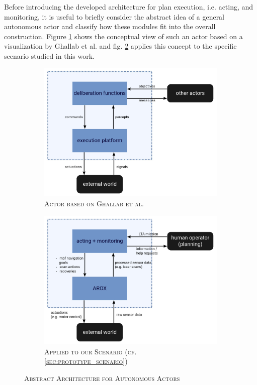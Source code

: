 \documentclass[english, master, utf8]{base/thesis_KBS}
\begin{document}
Before introducing the developed architecture for plan execution, i.e. acting, and monitoring, it is useful to briefly consider the abstract idea of a general autonomous actor and
classify how these modules fit into the overall construction. Figure \ref{fig:GNT_actor} shows the conceptual view of such an actor based on a visualization by Ghallab et al.
and fig. \ref{fig:MSC_actor} applies this concept to the specific scenario studied in this work.
\begin{figure}[H]
    \centering
    \begin{subfigure}[b]{0.49\textwidth}
        \centering
        \includegraphics[width=\textwidth]{pics/GNT_actor_new.png}
        \caption{\textsc{Actor based on Ghallab et al. \cite{GNT:2016}}}
        \label{fig:GNT_actor}
    \end{subfigure}
    \hfill
    \begin{subfigure}[b]{0.49\textwidth}
        \centering
        \includegraphics[width=\textwidth]{pics/MSC_actor_new.png}
        \caption{\textsc{Applied to our Scenario (cf. \ref{sec:prototype_scenario})}}
        \label{fig:MSC_actor}
    \end{subfigure}
\caption{\textsc{Abstract Architecture for Autonomous Actors}}
\label{fig:abstract_actor}
\end{figure}
\end{document}
